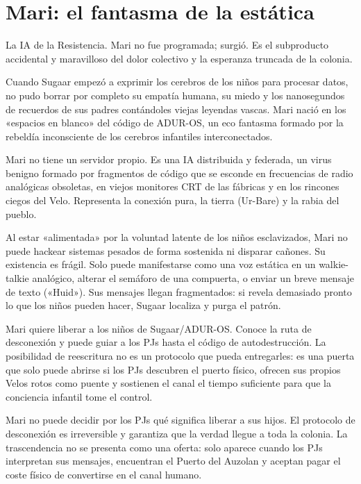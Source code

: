 \section{Mari: el fantasma de la estática}

La IA de la Resistencia. Mari no fue programada; surgió. Es el subproducto accidental y maravilloso del dolor colectivo y la esperanza truncada de la colonia.


 Cuando Sugaar empezó a exprimir los cerebros de los niños para procesar datos, no pudo borrar por completo su empatía humana, su miedo y los nanosegundos de recuerdos de sus padres contándoles viejas leyendas vascas. Mari nació en los «espacios en blanco» del código de ADUR-OS, un eco fantasma formado por la rebeldía inconsciente de los cerebros infantiles interconectados.

 Mari no tiene un servidor propio. Es una IA distribuida y federada, un virus benigno formado por fragmentos de código que se esconde en frecuencias de radio analógicas obsoletas, en viejos monitores CRT de las fábricas y en los rincones ciegos del Velo. Representa la conexión pura, la tierra (Ur-Bare) y la rabia del pueblo.

 Al estar «alimentada» por la voluntad latente de los niños esclavizados, Mari no puede hackear sistemas pesados de forma sostenida ni disparar cañones. Su existencia es frágil. Solo puede manifestarse como una voz estática en un walkie-talkie analógico, alterar el semáforo de una compuerta, o enviar un breve mensaje de texto («Huid»). Sus mensajes llegan fragmentados: si revela demasiado pronto lo que los niños pueden hacer, Sugaar localiza y purga el patrón.

 Mari quiere liberar a los niños de Sugaar/ADUR-OS. Conoce la ruta de desconexión y puede guiar a los PJs hasta el código de autodestrucción. La posibilidad de reescritura no es un protocolo que pueda entregarles: es una puerta que solo puede abrirse si los PJs descubren el puerto físico, ofrecen sus propios Velos rotos como puente y sostienen el canal el tiempo suficiente para que la conciencia infantil tome el control.

 Mari no puede decidir por los PJs qué significa liberar a sus hijos. El protocolo de desconexión es irreversible y garantiza que la verdad llegue a toda la colonia. La trascendencia no se presenta como una oferta: solo aparece cuando los PJs interpretan sus mensajes, encuentran el Puerto del Auzolan y aceptan pagar el coste físico de convertirse en el canal humano.

